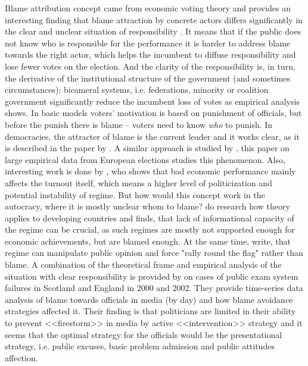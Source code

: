 \documentclass[a4paper, 12pt]{article}
\begin{document}
	Blame attribution concept came from economic voting theory and provides an interesting finding that blame attraction by concrete actors differs significantly in the clear and unclear situation of responsibility \parencite{econvote_polit}. It means that if the public does not know who is responsible for the performance it is harder to address blame towards the right actor, which helps the incumbent to diffuse responsibility and lose fewer votes on the election. And the clarity of the responsibility is, in turn, the derivative of the institutional structure of the government (and sometimes circumstances): bicameral systems, i.e. federations, minority or coalition government significantly reduce the incumbent loss of votes as \cite{econvote_polit} empirical analysis shows. In basic models voters' motivation is based on punishment of officials, but before the punish there is blame -- voters need to know \textit{who} to punish. In democracies, the attracter of blame is the current leader and it works clear, as it is described in the paper by \cite{attributionpre}. A similar approach is studied by \cite{blame_gov}, this paper on large empirical data from European elections studies this phenomenon. Also, interesting work is done by \cite{blame_turn}, who shows that bad economic performance mainly affects the turnout itself, which means a higher level of politicization and potential instability of regime. But how would this concept work in the autocracy, where it is mostly unclear whom to blame? \cite{developing} do research how theory applies to developing countries and finds, that lack of informational capacity of the regime can be crucial, as such regimes are mostly not supported enough for economic achievements, but are blamed enough. At the same time, \cite{post-soviet} write, that regime can manipulate public opinion and force "rally round the flag" rather than blame. A combination of the theoretical frame and empirical analysis of the situation with clear responsibility is provided by  \cite{Hood2009, Hood2016} on cases of public exam system failures in Scotland and England in 2000 and 2002. They provide time-series data analysis of blame towards officials in media (by day) and how blame avoidance strategies affected it. Their finding is that politicians are limited in their ability to prevent <<firestorm>> in media by active <<intervention>> strategy and it seems that the optimal strategy for the officials would be the presentational strategy, i.e. public excuses, basic problem admission and public attitudes affection. 
	
\end{document}
